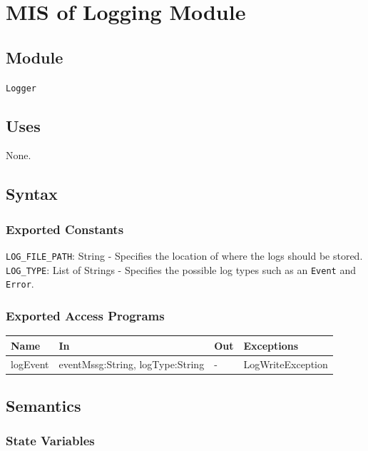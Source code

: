 \documentclass[12pt, titlepage]{article}
\begin{document}
\section{MIS of Logging Module} \label{LogModule}

\subsection{Module}
\texttt{Logger}

\subsection{Uses}
None. 
\subsection{Syntax}

\subsubsection{Exported Constants}
\texttt{LOG\_FILE\_PATH}: String - Specifies the location of where
the logs should be stored.\\
\texttt{LOG\_TYPE}: List of Strings - Specifies the possible log
types such as an \texttt{Event} and \texttt{Error}.\\

\subsubsection{Exported Access Programs}

\begin{center}
  \begin{tabular}{p{2cm} p{7cm} p{3cm} p{3cm}}
    \hline
    \textbf{Name} & \textbf{In} & \textbf{Out} & \textbf{Exceptions} \\
    \hline
    logEvent & eventMssg:String, logType:String & - & LogWriteException\\
    \hline
  \end{tabular}
\end{center}

\subsection{Semantics}

\subsubsection{State Variables}
\end{document}
